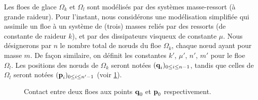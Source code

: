 Les floes de glace $\Omega_k$ et $\Omega_l$ sont modélisés par des systèmes masse-ressort (à grande raideur). Pour l'instant, nous considérons une modélisation simplifiée qui assimile un floe à un système de (trois) masses reliés par des ressorts (de constante de raideur $k$), et par des dissipateurs visqueux de constante $\mu$.
Nous désignerons par $n$ le nombre total de n\oe{}uds du floe $\Omega_k$, chaque n\oe{}ud ayant pour masse $m$. De façon similaire, on définit les constantes $k'$, $\mu'$, $n'$, $m'$ pour le floe $\Omega_l$. Les positions des n\oe{}uds de $\Omega_k$ seront notées $(\bm{\mathrm{q}}_i)_{0\leq i\leq n-1}$, tandis que celles de $\Omega_l$ seront notées $(\bm{\mathrm{p}}_i)_{0 \leq i\leq n'-1}$ (voir \cref{fig:contactmanuel}). 

\begin{figure}[!h]
    \centering
    \caption{Contact entre deux floes aux points $\bm{\mathrm{q}}_0$ et $\bm{\mathrm{p}}_0$ respectivement.}
    \label{fig:contactmanuel}
\end{figure}

